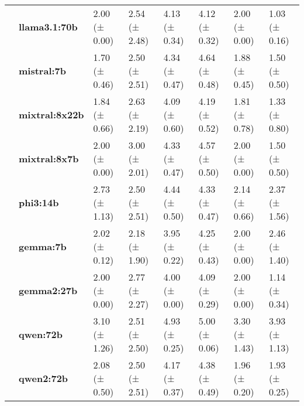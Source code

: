 \begin{longtable}{llllllll}
\textbf{} & \textbf{llama3.1:70b} & 2.00 (± 0.00) & 2.54 (± 2.48) & 4.13 (± 0.34) & 4.12 (± 0.32) & 2.00 (± 0.00) & 1.03 (± 0.16) \\
\textbf{} & \textbf{mistral:7b} & 1.70 (± 0.46) & 2.50 (± 2.51) & 4.34 (± 0.47) & 4.64 (± 0.48) & 1.88 (± 0.45) & 1.50 (± 0.50) \\
\textbf{} & \textbf{mixtral:8x22b} & 1.84 (± 0.66) & 2.63 (± 2.19) & 4.09 (± 0.60) & 4.19 (± 0.52) & 1.81 (± 0.78) & 1.33 (± 0.80) \\
\textbf{} & \textbf{mixtral:8x7b} & 2.00 (± 0.00) & 3.00 (± 2.01) & 4.33 (± 0.47) & 4.57 (± 0.50) & 2.00 (± 0.00) & 1.50 (± 0.50) \\
\textbf{} & \textbf{phi3:14b} & 2.73 (± 1.13) & 2.50 (± 2.51) & 4.44 (± 0.50) & 4.33 (± 0.47) & 2.14 (± 0.66) & 2.37 (± 1.56) \\
\textbf{} & \textbf{gemma:7b} & 2.02 (± 0.12) & 2.18 (± 1.90) & 3.95 (± 0.22) & 4.25 (± 0.43) & 2.00 (± 0.00) & 2.46 (± 1.40) \\
\textbf{} & \textbf{gemma2:27b} & 2.00 (± 0.00) & 2.77 (± 2.27) & 4.00 (± 0.00) & 4.09 (± 0.29) & 2.00 (± 0.00) & 1.14 (± 0.34) \\
\textbf{} & \textbf{qwen:72b} & 3.10 (± 1.26) & 2.51 (± 2.50) & 4.93 (± 0.25) & 5.00 (± 0.06) & 3.30 (± 1.43) & 3.93 (± 1.13) \\
\textbf{} & \textbf{qwen2:72b} & 2.08 (± 0.50) & 2.50 (± 2.51) & 4.17 (± 0.37) & 4.38 (± 0.49) & 1.96 (± 0.20) & 1.93 (± 0.25) \\
\cline{1-8}
\end{longtable}
